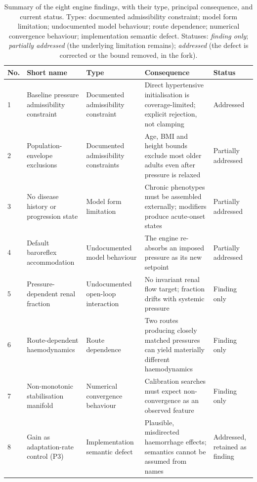 \documentclass[preprint,12pt,nopreprintline]{elsarticle}
\begin{document}
\begin{table}[t]
\centering
\caption{Summary of the eight engine findings, with their type, principal consequence, and current status. Types: documented admissibility constraint; model form limitation; undocumented model behaviour; route dependence; numerical convergence behaviour; implementation semantic defect. Statuses: \emph{finding only}; \emph{partially addressed} (the underlying limitation remains); \emph{addressed} (the defect is corrected or the bound removed, in the fork).}
\label{tab:findings}
\begin{tabularx}{\textwidth}{lp{3.0cm}p{2.8cm}Xp{2.2cm}}
\toprule
No. & Short name & Type & Consequence & Status \\
\midrule
1 & Baseline pressure admissibility constraint & Documented admissibility constraint & Direct hypertensive initialisation is coverage-limited; explicit rejection, not clamping & Addressed \\
2 & Population-envelope exclusions & Documented admissibility constraints & Age, BMI and height bounds exclude most older adults even after pressure is relaxed & Partially addressed \\
3 & No disease history or progression state & Model form limitation & Chronic phenotypes must be assembled externally; modifiers produce acute-onset states & Partially addressed \\
4 & Default baroreflex accommodation & Undocumented model behaviour & The engine re-absorbs an imposed pressure as its new setpoint & Partially addressed \\
5 & Pressure-dependent renal fraction & Undocumented open-loop interaction & No invariant renal flow target; fraction drifts with systemic pressure & Finding only \\
6 & Route-dependent haemodynamics & Route dependence & Two routes producing closely matched pressures can yield materially different haemodynamics & Finding only \\
7 & Non-monotonic stabilisation manifold & Numerical convergence behaviour & Calibration searches must expect non-convergence as an observed feature & Finding only \\
8 & Gain as adaptation-rate control (P3) & Implementation semantic defect & Plausible, misdirected haemorrhage effects; semantics cannot be assumed from names & Addressed, retained as finding \\
\bottomrule
\end{tabularx}
\end{table}
\end{document}
